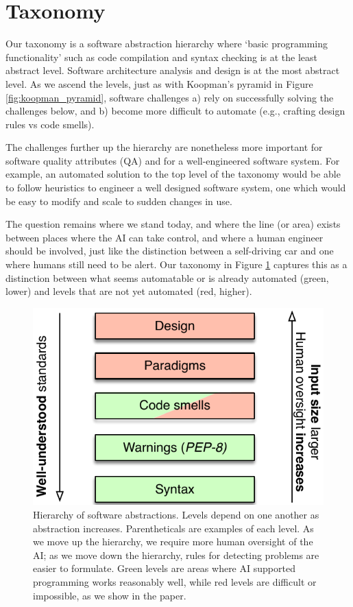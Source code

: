 \section{Taxonomy}
Our taxonomy is a software abstraction hierarchy where `basic programming functionality' such as code compilation and syntax checking is at the least abstract level.
Software architecture analysis and design is at the most abstract level.
As we ascend the levels, just as with Koopman's pyramid in Figure \ref{fig:koopman_pyramid}, software challenges a) rely on successfully solving the challenges below, and b) become more difficult to automate (e.g., crafting design rules vs code smells). 

The challenges further up the hierarchy are nonetheless more important for software quality attributes (QA) \cite{Ernst2017} and for a well-engineered software system.
For example, an automated solution to the top level of the taxonomy would be able to follow heuristics to engineer a well designed software system, one which would be easy to modify and scale to sudden changes in use.

The question remains where we stand today, and where the line (or area) exists between places where the AI can take control, and where a human engineer should be involved, just like the distinction between a self-driving car and one where humans still need to be alert.
Our taxonomy in Figure \ref{fig:levels} captures this as a distinction between what seems automatable or is already automated (green, lower) and levels that are not yet automated (red, higher).

\begin{figure}
    \includegraphics[width=.7\linewidth]{Figures/taxonomy-copilot.pdf}
    \caption{Hierarchy of software abstractions. Levels depend on one another as abstraction increases. Parentheticals are examples of each level. As we move up the hierarchy, we require more human oversight of the AI; as we move down the hierarchy, rules for detecting problems are easier to formulate. Green levels are areas where AI supported programming works reasonably well, while red levels are difficult or impossible, as we show in the paper. }
    \label{fig:levels}
\end{figure}

